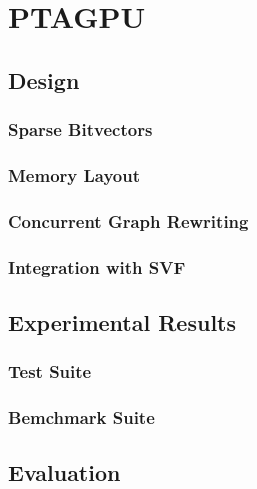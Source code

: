 \chapter{PTAGPU} \label{chap:main}
\section{Design}
\subsection{Sparse Bitvectors}
\subsection{Memory Layout}
\subsection{Concurrent Graph Rewriting}
\subsection{Integration with SVF}
\section{Experimental Results}
\subsection{Test Suite}
\subsection{Bemchmark Suite}
\section{Evaluation}
